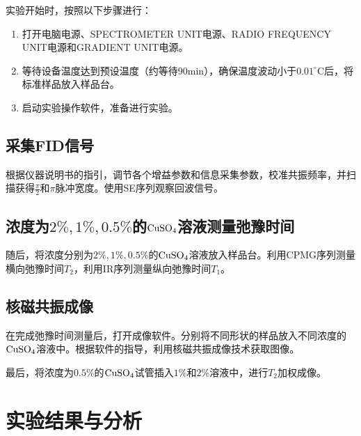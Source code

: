 \documentclass[font=default]{mpltx}
\begin{document}
实验开始时，按照以下步骤进行：

\begin{enumerate}
    \item 打开电脑电源、SPECTROMETER UNIT电源、RADIO FREQUENCY UNIT电源和GRADIENT UNIT电源。
    
    \item 等待设备温度达到预设温度（约等待90min），确保温度波动小于$0.01^\circ$C后，将标准样品放入样品台。
    
    \item 启动实验操作软件，准备进行实验。
\end{enumerate}

\subsection{采集FID信号}

根据仪器说明书的指引，调节各个增益参数和信息采集参数，校准共振频率，并扫描获得$\frac{\pi}{2}$和$\pi$脉冲宽度。使用SE序列观察回波信号。

\subsection{浓度为$2\%,1\%,0.5\%$的${\rm CuSO_4}$溶液测量弛豫时间}

随后，将浓度分别为$2\%,1\%,0.5\%$的${\rm CuSO_4}$溶液放入样品台。利用CPMG序列测量横向弛豫时间$T_2$，利用IR序列测量纵向弛豫时间$T_1$。

\subsection{核磁共振成像}

在完成弛豫时间测量后，打开成像软件。分别将不同形状的样品放入不同浓度的${\rm CuSO_4}$溶液中。根据软件的指导，利用核磁共振成像技术获取图像。

最后，将浓度为$0.5\%$的${\rm CuSO_4}$试管插入$1\%$和$2\%$溶液中，进行$T_2$加权成像。
\section{实验结果与分析}
\end{document}

